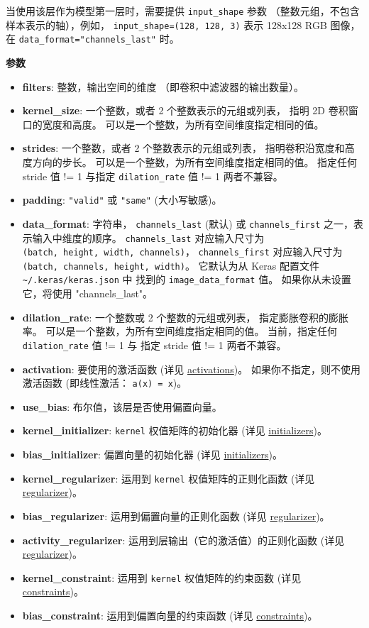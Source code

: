 当使用该层作为模型第一层时，需要提供 \texttt{input\_shape} 参数
（整数元组，不包含样本表示的轴），例如，
\texttt{input\_shape=(128,\ 128,\ 3)} 表示 128x128 RGB 图像， 在
\texttt{data\_format="channels\_last"} 时。

\textbf{参数}

\begin{itemize}
\tightlist
\item
  \textbf{filters}: 整数，输出空间的维度 （即卷积中滤波器的输出数量）。
\item
  \textbf{kernel\_size}: 一个整数，或者 2 个整数表示的元组或列表， 指明
  2D 卷积窗口的宽度和高度。 可以是一个整数，为所有空间维度指定相同的值。
\item
  \textbf{strides}: 一个整数，或者 2 个整数表示的元组或列表，
  指明卷积沿宽度和高度方向的步长。
  可以是一个整数，为所有空间维度指定相同的值。 指定任何 stride 值 != 1
  与指定 \texttt{dilation\_rate} 值 != 1 两者不兼容。
\item
  \textbf{padding}: \texttt{"valid"} 或 \texttt{"same"} (大小写敏感)。
\item
  \textbf{data\_format}: 字符串， \texttt{channels\_last} (默认) 或
  \texttt{channels\_first} 之一，表示输入中维度的顺序。
  \texttt{channels\_last} 对应输入尺寸为
  \texttt{(batch,\ height,\ width,\ channels)}，
  \texttt{channels\_first} 对应输入尺寸为
  \texttt{(batch,\ channels,\ height,\ width)}。 它默认为从 Keras
  配置文件 \texttt{\textasciitilde{}/.keras/keras.json} 中 找到的
  \texttt{image\_data\_format} 值。 如果你从未设置它，将使用
  "channels\_last"。
\item
  \textbf{dilation\_rate}: 一个整数或 2 个整数的元组或列表，
  指定膨胀卷积的膨胀率。 可以是一个整数，为所有空间维度指定相同的值。
  当前，指定任何 \texttt{dilation\_rate} 值 != 1 与 指定 stride 值 != 1
  两者不兼容。
\item
  \textbf{activation}: 要使用的激活函数 (详见
  \hyperref[activations]{activations})。
  如果你不指定，则不使用激活函数 (即线性激活： \texttt{a(x)\ =\ x})。
\item
  \textbf{use\_bias}: 布尔值，该层是否使用偏置向量。
\item
  \textbf{kernel\_initializer}: \texttt{kernel} 权值矩阵的初始化器 (详见
  \hyperref[initializers]{initializers})。
\item
  \textbf{bias\_initializer}: 偏置向量的初始化器 (详见
  \hyperref[initializers]{initializers})。
\item
  \textbf{kernel\_regularizer}: 运用到 \texttt{kernel}
  权值矩阵的正则化函数 (详见 \hyperref[regularizers]{regularizer})。
\item
  \textbf{bias\_regularizer}: 运用到偏置向量的正则化函数 (详见
  \hyperref[regularizers]{regularizer})。
\item
  \textbf{activity\_regularizer}: 运用到层输出（它的激活值）的正则化函数
  (详见 \hyperref[regularizers]{regularizer})。
\item
  \textbf{kernel\_constraint}: 运用到 \texttt{kernel} 权值矩阵的约束函数
  (详见 \hyperref[constraints]{constraints})。
\item
  \textbf{bias\_constraint}: 运用到偏置向量的约束函数 (详见
  \hyperref[constraints]{constraints})。
\end{itemize}

